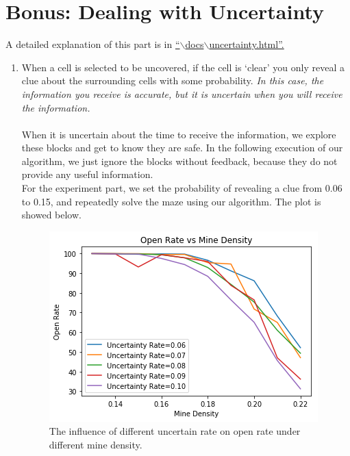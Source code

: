 \documentclass[letter]{article}
\begin{document}
\section{Bonus: Dealing with Uncertainty}
A detailed explanation of this part is in \href{run:Uncertainty.html}{``$ \backslash $docs$ \backslash $uncertainty.html''.}
\begin{enumerate}
	\label{zhichao2}
	\item {When a cell is selected to be uncovered, if the cell is ‘clear’ you only reveal a clue about the surrounding cells with some probability. \textit{In this case, the information you receive is accurate, but it is uncertain when you will receive the information.}} \\
	\\
	When it is uncertain about the time to receive the information, we explore these blocks and get to know they are safe. In the following execution of our algorithm, we just ignore the blocks without feedback, because they do not provide any useful information. \\
	For the experiment part, we set the probability of revealing a clue from 0.06 to 0.15, and repeatedly solve the maze using our algorithm. The plot is showed below.
	\begin{figure}[H]
		\includegraphics[width=\textwidth]{../pics/plt1.png}
		\caption{\label{fig:plt1} The influence of different uncertain rate on open rate under different mine density.}
		\endminipage\hfill

\end{figure}
\end{enumerate}
\end{document}
